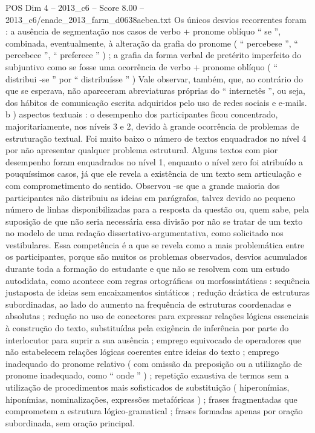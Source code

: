 \begin{textsample}{POS Dim 4 – 2013\_c6 – Score 8.00 – 2013\_c6/enade\_2013\_farm\_d0638aebea.txt}
Os únicos desvios recorrentes foram : a ausência de segmentação nos casos de verbo + pronome oblíquo “ se ”, combinada, eventualmente, à alteração da grafia do pronome ( “ percebese ”, “ percebece ”, “ preferece ” ) ; a grafia da forma verbal de pretérito imperfeito do subjuntivo como se fosse uma ocorrência de verbo + pronome oblíquo ( “ distribui -se ” por “ distribuísse ” ) Vale observar, também, que, ao contrário do que se esperava, não apareceram abreviaturas próprias do “ internetês ”, ou seja, dos hábitos de comunicação escrita adquiridos pelo uso de redes sociais e e-mails. b ) aspectos textuais : o desempenho dos participantes ficou concentrado, majoritariamente, nos níveis 3 e 2, devido à grande ocorrência de problemas de estruturação textual.
Foi muito baixo o número de textos enquadrados no nível 4 por não apresentar qualquer problema estrutural.
Alguns textos com pior desempenho foram enquadrados no nível 1, enquanto o nível zero foi atribuído a pouquíssimos casos, já que ele revela a existência de um texto sem articulação e com comprometimento do sentido.
Observou -se que a grande maioria dos participantes não distribuiu as ideias em parágrafos, talvez devido ao pequeno número de linhas disponibilizadas para a resposta da questão ou, quem sabe, pela suposição de que não seria necessária essa divisão por não se tratar de um texto no modelo de uma redação dissertativo-argumentativa, como solicitado nos vestibulares.
Essa competência é a que se revela como a mais problemática entre os participantes, porque são muitos os problemas observados, desvios acumulados durante toda a formação do estudante e que não se resolvem com um estudo autodidata, como acontece com regras ortográficas ou morfossintáticas : sequência justaposta de ideias sem encaixamentos sintáticos ; redução drástica de estruturas subordinadas, ao lado do aumento na frequência de estruturas coordenadas e absolutas ; redução no uso de conectores para expressar relações lógicas essenciais à construção do texto, substituídas pela exigência de inferência por parte do interlocutor para suprir a sua ausência ; emprego equivocado de operadores que não estabelecem relações lógicas coerentes entre ideias do texto ; emprego inadequado do pronome relativo ( com omissão da preposição ou a utilização de pronome inadequado, como “ onde ” ) ; repetição exaustiva de termos sem a utilização de procedimentos mais sofisticados de substituição ( hiperonímias, hiponímias, nominalizações, expressões metafóricas ) ; frases fragmentadas que comprometem a estrutura lógico-gramatical ; frases formadas apenas por oração subordinada, sem oração principal.

\end{textsample}
